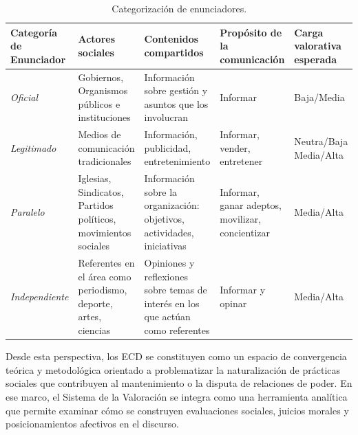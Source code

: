 \documentclass[spanish]{textolivre}
\begin{document}
\begin{table}[htbp]
\centering
\begin{threeparttable}
\caption{Categorización de enunciadores.}
\label{tab2}

\footnotesize

\begin{tabularx}{\textwidth}{
>{\raggedright\arraybackslash}p{}
>{\raggedright\arraybackslash}p{}
>{\raggedright\arraybackslash}p{}
>{\raggedright\arraybackslash}p{}
>{\raggedright\arraybackslash}p{}}
\toprule
\textbf{Categoría de Enunciador} &
\textbf{Actores sociales} &
\textbf{Contenidos compartidos} &
\textbf{Propósito de la comunicación} &
\textbf{Carga valorativa esperada} \\
\midrule

\textit{Oficial} &
Gobiernos, Organismos públicos e instituciones &
Información sobre gestión y asuntos que los involucran &
Informar &
Baja/Media \\

\addlinespace

\textit{Legitimado} &
Medios de comunicación tradicionales &
Información, publicidad, entretenimiento &
Informar, vender, entretener &
Neutra/Baja Media/Alta\\

\addlinespace

\textit{Paralelo} &
Iglesias, Sindicatos, Partidos políticos, movimientos sociales &
Información sobre la organización: objetivos, actividades, iniciativas &
Informar, ganar adeptos, movilizar, concientizar &
Media/Alta \\

\addlinespace

\textit{Independiente} &
Referentes en el área como periodismo, deporte, artes, ciencias &
Opiniones y reflexiones sobre temas de interés en los que actúan como referentes &
Informar y opinar &
Media/Alta \\

\bottomrule
\end{tabularx}
\end{threeparttable}
\end{table}

Desde esta perspectiva, los ECD se constituyen como un espacio de convergencia teórica y metodológica orientado a problematizar la naturalización de prácticas sociales que contribuyen al mantenimiento o la disputa de relaciones de poder. En ese marco, el Sistema de la Valoración se integra como una herramienta analítica que permite examinar cómo se construyen evaluaciones sociales, juicios morales y posicionamientos afectivos en el discurso.
\end{document}
